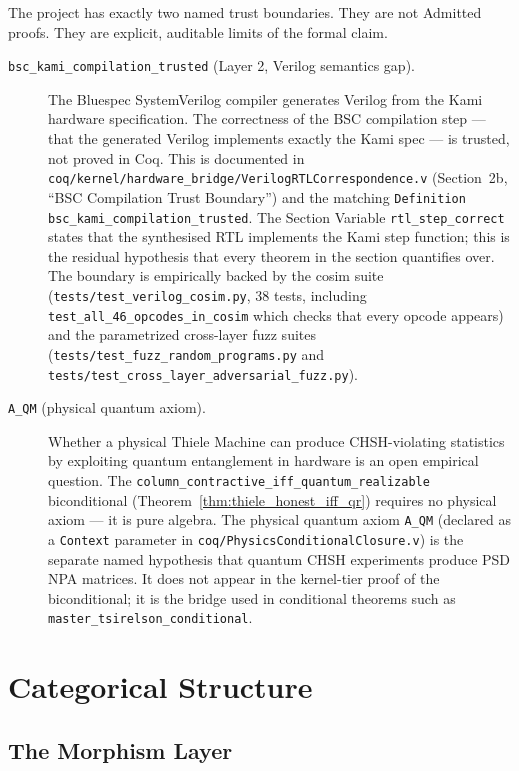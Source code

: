 \documentclass[11pt, a4paper]{report}
\theoremstyle{definition}
\theoremstyle{plain}
\begin{document}
The project has exactly two named trust boundaries. They are not Admitted proofs. They are explicit, auditable limits of the formal claim.

\begin{description}
\item[\texttt{bsc\_kami\_compilation\_trusted} (Layer 2, Verilog semantics gap).] The Bluespec SystemVerilog compiler generates Verilog from the Kami hardware specification. The correctness of the BSC compilation step — that the generated Verilog implements exactly the Kami spec — is trusted, not proved in Coq. This is documented in \texttt{coq/kernel/hardware\_bridge/VerilogRTLCorrespondence.v} (Section~2b, ``BSC Compilation Trust Boundary'') and the matching \texttt{Definition bsc\_kami\_compilation\_trusted}. The Section Variable \texttt{rtl\_step\_correct} states that the synthesised RTL implements the Kami step function; this is the residual hypothesis that every theorem in the section quantifies over. The boundary is empirically backed by the cosim suite (\texttt{tests/test\_verilog\_cosim.py}, 38 tests, including \texttt{test\_all\_46\_opcodes\_in\_cosim} which checks that every opcode appears) and the parametrized cross-layer fuzz suites (\texttt{tests/test\_fuzz\_random\_programs.py} and \texttt{tests/test\_cross\_layer\_adversarial\_fuzz.py}).

\item[\texttt{A\_QM} (physical quantum axiom).] Whether a physical Thiele Machine can produce CHSH-violating statistics by exploiting quantum entanglement in hardware is an open empirical question. The \texttt{column\_contractive\_iff\_quantum\_realizable} biconditional (Theorem~\ref{thm:thiele_honest_iff_qr}) requires no physical axiom — it is pure algebra. The physical quantum axiom \texttt{A\_QM} (declared as a \texttt{Context} parameter in \texttt{coq/PhysicsConditionalClosure.v}) is the separate named hypothesis that quantum CHSH experiments produce PSD NPA matrices. It does not appear in the kernel-tier proof of the biconditional; it is the bridge used in conditional theorems such as \texttt{master\_tsirelson\_conditional}.
\end{description}
\chapter{Categorical Structure}
\label{ch:categorical}

\section{The Morphism Layer}
\end{document}
